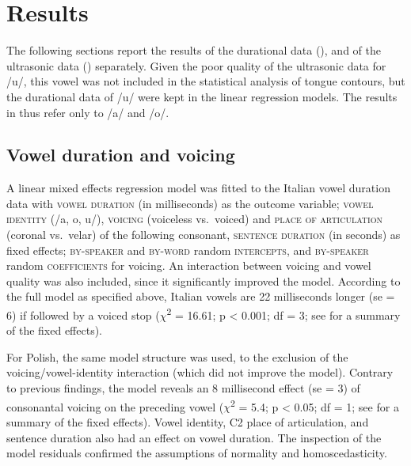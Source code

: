 \documentclass[authoryear, 5p]{elsarticle}
\begin{document}
\section{Results}\label{results}

The following sections report the results of the durational data
(), and of the ultrasonic data ()
separately. Given the poor quality of the ultrasonic data for /u/, this
vowel was not included in the statistical analysis of tongue contours,
but the durational data of /u/ were kept in the linear regression
models. The results in  thus refer only to /a/ and /o/.

\subsection{Vowel duration and
voicing}\label{vowel-duration-and-voicing}

\label{s:vow-duration}

A linear mixed effects regression model was fitted to the Italian vowel
duration data with \textsc{vowel duration} (in milliseconds) as the
outcome variable; \textsc{vowel identity} (/a, o, u/), \textsc{voicing}
(voiceless vs.~voiced) and \textsc{place of articulation} (coronal
vs.~velar) of the following consonant, \textsc{sentence duration} (in
seconds) as fixed effects; \textsc{by-speaker} and \textsc{by-word}
random \textsc{intercepts}, and \textsc{by-speaker} random
\textsc{coefficients} for voicing. An interaction between voicing and
vowel quality was also included, since it significantly improved the
model. According to the full model as specified above, Italian vowels
are 22 milliseconds longer (se = 6) if followed by a voiced stop
(\(\chi\)\textsuperscript{2} = 16.61; p \textless{} 0.001; df = 3; see
 for a summary of the fixed effects).

For Polish, the same model structure was used, to the exclusion of the
voicing/vowel-identity interaction (which did not improve the model).
Contrary to previous findings, the model reveals an 8 millisecond effect
(se = 3) of consonantal voicing on the preceding vowel
(\(\chi\)\textsuperscript{2} = 5.4; p \textless{} 0.05; df = 1; see
 for a summary of the fixed effects). Vowel
identity, C2 place of articulation, and sentence duration also had an
effect on vowel duration. The inspection of the model residuals
confirmed the assumptions of normality and homoscedasticity.
\end{document}
